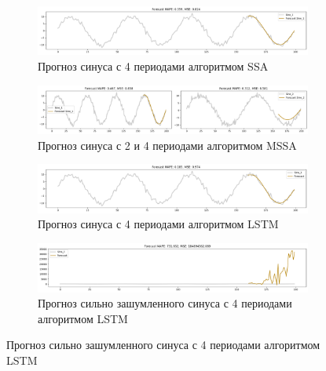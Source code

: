 \documentclass{article}
\begin{document}
\begin{figure}[H]
    \begin{subfigure}
	\centering
	\includegraphics[width=1\textwidth]{figures/ssa_sin_low_noise.png}
	\caption{Прогноз синуса с 4 периодами алгоритмом SSA}
	\label{fig:fig2}
    \end{subfigure}

    \vspace{\baselineskip}

    \begin{subfigure}
	\centering
	\includegraphics[width=1\textwidth]{figures/mssa_2sin_low_noise.png}
	\caption{Прогноз синуса с 2 и 4 периодами алгоритмом MSSA}
	\label{fig:fig2}
    \end{subfigure}

    \vspace{\baselineskip}

    \begin{subfigure}
	\centering
	\includegraphics[width=1\textwidth]{figures/lstm_sin_low_noise.png}
	\caption{Прогноз синуса с 4 периодами алгоритмом LSTM}
	\label{fig:fig2}
    \end{subfigure}

    \vspace{\baselineskip}

    \begin{subfigure}
	\centering
	\includegraphics[width=1\textwidth]{figures/lstm_sin_high_noise.png}
	\caption{Прогноз сильно зашумленного синуса с 4 периодами алгоритмом LSTM}
	\label{fig:fig2}
    \end{subfigure}


\end{figure}
\end{document}

